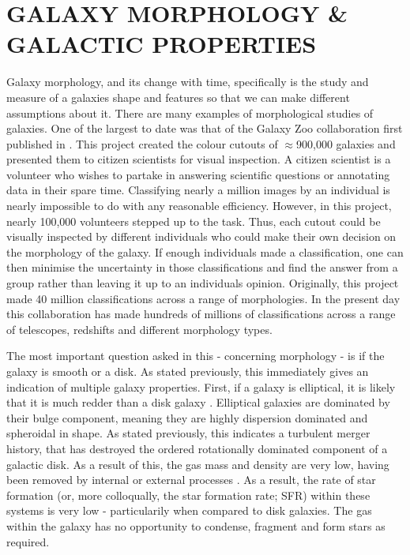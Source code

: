 \section{GALAXY MORPHOLOGY \& GALACTIC PROPERTIES}
\noindent Galaxy morphology, and its change with time, specifically is the study and measure of a galaxies shape and features so that we can make different assumptions about it. There are many examples of morphological studies of galaxies. One of the largest to date was that of the Galaxy Zoo collaboration first published in \citet{2008MNRAS.389.1179L}. This project created the colour cutouts of $\approx$900,000 galaxies and presented them to citizen scientists for visual inspection. A citizen scientist is a volunteer who wishes to partake in answering scientific questions or annotating data in their spare time. Classifying nearly a million images by an individual is nearly impossible to do with any reasonable efficiency. However, in this project, nearly 100,000 volunteers stepped up to the task. Thus, each cutout could be visually inspected by different individuals who could make their own decision on the morphology of the galaxy. If enough individuals made a classification, one can then minimise the uncertainty in those classifications and find the answer from a group rather than leaving it up to an individuals opinion. Originally, this project made 40 million classifications across a range of morphologies. In the present day this collaboration has made hundreds of millions of classifications across a range of telescopes, redshifts and different morphology types.

The most important question asked in this - concerning morphology - is if the galaxy is smooth or a disk. As stated previously, this immediately gives an indication of multiple galaxy properties. First, if a galaxy is elliptical, it is likely that it is much redder than a disk galaxy \citep{1992MNRAS.254..589B}. Elliptical galaxies are dominated by their bulge component, meaning they are highly dispersion dominated and spheroidal in shape. As stated previously, this indicates a turbulent merger history, that has destroyed the ordered rotationally dominated component of a galactic disk. As a result of this, the gas mass and density are very low, having been removed by internal or external processes \citep{1976ApJ...204..365F}. As a result, the rate of star formation (or, more colloqually, the star formation rate; SFR) within these systems is very low - particularily when compared to disk galaxies. The gas within the galaxy has no opportunity to condense, fragment and form stars as required.

